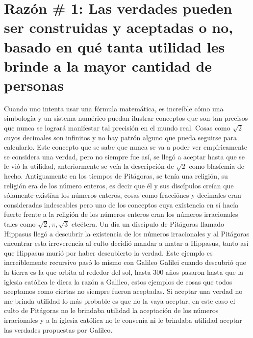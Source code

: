 \documentclass{article}
\begin{document}
\section{Razón \# 1: Las verdades pueden ser construidas y aceptadas o no, basado en qué tanta utilidad les brinde a la mayor cantidad de personas}
Cuando uno intenta usar una fórmula matemática, es increíble cómo una simbología y un sistema numérico puedan ilustrar conceptos que son tan precisos que nunca se logrará manifestar tal precisión en el mundo real. 
Cosas como $\sqrt{2}$ cuyos decimales son infinitos y no hay patrón alguno que pueda seguirse para calcularlo. Este concepto que se sabe que nunca se va a poder ver empíricamente se considera una verdad, pero no siempre fue así, se llegó a aceptar hasta que se le vió la utilidad, anteriormente se veía la descripción de $\sqrt{2}$ como blasfemia de hecho. 
Antiguamente en los tiempos de Pitágoras, se tenía una religión, su religión era de los número enteros, es decir que él y sus discípulos creían que sólamente existían los números enteros, cosas como fracciónes y decimales eran consideradas indeseables pero uno de los conceptos cuya existencia en sí hacía fuerte frente a la religión de los números enteros eran los números irracionales tales como $\sqrt{2}, \pi, \sqrt{3}$ etcétera. 
Un día un discípulo de Pitágoras llamado Hippasus llegó a descubrir la existencia de los números irracionales y al Pitágoras encontrar esta irreverencia al culto decidió mandar a matar a Hippasus, tanto así que Hippasus murió por haber descubierto la verdad. 
Este ejemplo es increíblemente recursivo pasó lo mismo con Galileo Galilei cuando descubrió que la tierra es la que orbita al rededor del sol, hasta 300 años pasaron hasta que la iglesia católica le diera la razón a Galileo, estos ejemplos de cosas que todos aceptamos como ciertas no siempre fueron aceptadas.
Si aceptar una verdad no me brinda utilidad lo más probable es que no la vaya aceptar, en este caso el culto de Pitágoras no le brindaba utilidad la aceptación de los números irracionales y a la iglesia católica no le convenía ni le brindaba utilidad aceptar las verdades propuestas por Galileo.
\end{document}
